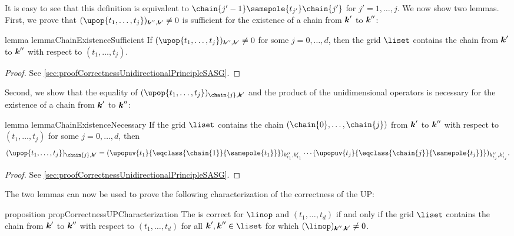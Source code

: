 It is easy to see that this definition is equivalent to
$\chain{j'-1} \samepole{t_{j'}} \chain{j'}$ for $j' = 1, \dotsc, j$.
We now show two lemmas.
First, we prove that $(\upop{t_1,\dotsc,t_j})_{\*k'',\*k'} \not= 0$
is sufficient for the existence of a chain from ${\boldsymbol{k}}'$ to ${\boldsymbol{k}}''$:

\begin{restatable}{%
  lemma%
}{%
  lemmaChainExistenceSufficient%
}
  \label{lemma:chainExistenceSufficient}
  If $(\upop{t_1,\dotsc,t_j})_{\*k'',\*k'} \not= 0$
  for some $j = 0, \dotsc, d$,
  then the grid $\liset$ contains the chain from ${\boldsymbol{k}}'$ to ${\boldsymbol{k}}''$
  with respect to $(t_1, \dotsc, t_j)$.
\end{restatable}

\begin{proof}
  See \cref{sec:proofCorrectnessUnidirectionalPrincipleSASG}.
\end{proof}

Second, we show that the equality of
$(\upop{t_1,\dotsc,t_j})_{\chain{j},\*k'}$ and the product of
the unidimensional operators is necessary for the
existence of a chain from ${\boldsymbol{k}}'$ to ${\boldsymbol{k}}''$:

\begin{restatable}{%
  lemma%
}{%
  lemmaChainExistenceNecessary%
}
  \label{lemma:chainExistenceNecessary}
  If the grid $\liset$ contains the chain $(\chain{0}, \dotsc, \chain{j})$
  from ${\boldsymbol{k}}'$ to ${\boldsymbol{k}}''$ with respect to $(t_1, \dotsc, t_j)$
  for some $j = 0, \dotsc, d$, then
  \begin{equation}
    \label{eq:lemmaChainExistenceNecessary}
    (\upop{t_1,\dotsc,t_j})_{\chain{j},\*k'}
    = (\upopuv{t_1}{\eqclass{\chain{1}}{\samepole{t_1}}})_{k''_{t_1},k'_{t_1}}
    \dotsm
    (\upopuv{t_j}{\eqclass{\chain{j}}{\samepole{t_j}}})_{k''_{t_j},k'_{t_j}}.
  \end{equation}
\end{restatable}

\begin{proof}
  See \cref{sec:proofCorrectnessUnidirectionalPrincipleSASG}.
\end{proof}

The two lemmas can now be used to prove the following characterization
of the correctness of the UP:

\begin{restatable}{%
  proposition%
}{%
  propCorrectnessUPCharacterization%
}
  \label{prop:correctnessUPCharacterization}
  The \up is correct for $\linop$ and $(t_1, \dotsc, t_d)$
  if and only if the grid $\liset$ contains the chain from ${\boldsymbol{k}}'$ to ${\boldsymbol{k}}''$
  with respect to $(t_1, \dotsc, t_d)$ for all $\*k', \*k'' \in \liset$
  for which $(\linop)_{\*k'',\*k'} \not= 0$.
\end{restatable}

